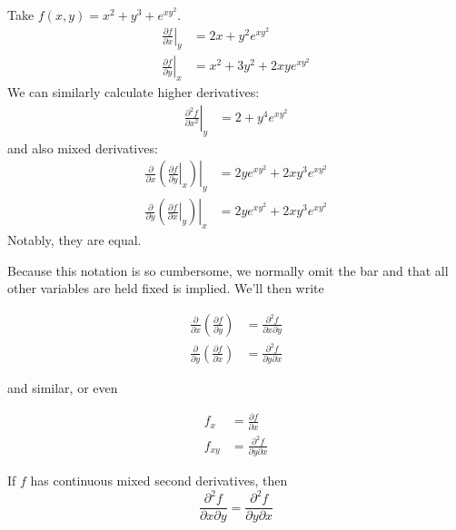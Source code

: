 \documentclass{../../template/note}
\begin{document}
    \begin{example}
        Take \(f(x, y) = x^2+y^3+e^{xy^2}\).
        \begin{align*}
            \left.\frac{\partial f}{\partial x}\right|_y &= 2x + y^2e^{xy^2} \\
            \left.\frac{\partial f}{\partial y}\right|_x &= x^2 + 3y^2 + 2xye^{xy^2}
        \end{align*}
        We can similarly calculate higher derivatives:
        \begin{align*}
            \left.\frac{\partial^2 f}{\partial x^2}\right|_y &= 2 + y^4e^{xy^2}
        \end{align*}
        and also mixed derivatives:
        \begin{align*}
            \frac{\partial}{\partial x}\left.\left(\left.\frac{\partial f}{\partial y}\right|_x\right)\right|_y &= 2ye^{xy^2}+2xy^3e^{xy^2} \\
            \frac{\partial}{\partial y}\left.\left(\left.\frac{\partial f}{\partial x}\right|_y\right)\right|_x &= 2ye^{xy^2}+2xy^3e^{xy^2}
        \end{align*}
        Notably, they are equal.
    \end{example}
    Because this notation is so cumbersome, we normally omit the bar and that all other variables are held fixed is implied. We'll then write

    \begin{align*}
        \frac{\partial}{\partial x} \left(\frac{\partial f}{\partial y}\right) &= \frac{\partial^2 f}{\partial x \partial y} \\
        \frac{\partial}{\partial y} \left(\frac{\partial f}{\partial x}\right) &= \frac{\partial^2 f}{\partial y \partial x}
    \end{align*}

    and similar, or even

    \begin{align*}
        f_x &= \frac{\partial f}{\partial x} \\
        f_{xy} &= \frac{\partial^2 f}{\partial y \partial x}
    \end{align*}
    
    \begin{proposition}
        If \(f\) has continuous mixed second derivatives, then
        \[
            \frac{\partial^2 f}{\partial x \partial y} = \frac{\partial^2 f}{\partial y \partial x}
        \]
    \end{proposition}
\end{document}
